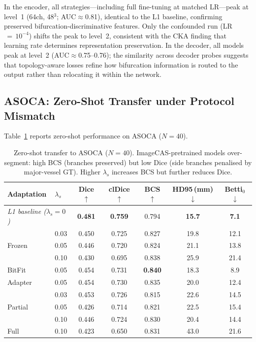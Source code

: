 \documentclass[runningheads]{llncs}
\begin{document}
In the encoder, all strategies---including full fine-tuning at matched LR---peak at level~1 (64ch, 48$^3$; AUC${\approx}$0.81), identical to the L1 baseline, confirming preserved bifurcation-discriminative features.
Only the confounded run (LR$\,{=}\,10^{-4}$) shifts the peak to level~2, consistent with the CKA finding that learning rate determines representation preservation.
In the decoder, all models peak at level~2 (AUC${\approx}$0.75--0.76); the similarity across decoder probes suggests that topology-aware losses refine how bifurcation information is routed to the output rather than relocating it within the network.

\subsection{ASOCA: Zero-Shot Transfer under Protocol Mismatch}
\label{sec:asoca_results}

Table~\ref{tab:zeroshot} reports zero-shot performance on ASOCA ($N{=}40$).

\begin{table}[t]
\caption{Zero-shot transfer to ASOCA ($N{=}40$). ImageCAS-pretrained models over-segment: high BCS (branches preserved) but low Dice (side branches penalised by major-vessel GT). Higher $\lambda_s$ increases BCS but further reduces Dice.}
\label{tab:zeroshot}
\centering
\small
\begin{tabular}{llccccc}
\toprule
Adaptation & $\lambda_s$ & Dice $\uparrow$ & clDice $\uparrow$ & BCS $\uparrow$ & HD95\,(mm) $\downarrow$ & Betti$_0$ $\downarrow$ \\
\midrule
\multicolumn{2}{l}{\textit{L1 baseline ($\lambda_s{=}0$)}} & \textbf{0.481} & \textbf{0.759} & 0.794 & \textbf{15.7} & \textbf{7.1} \\
\midrule
\multirow{3}{*}{Frozen}
 & 0.03 & 0.450 & 0.725 & 0.827 & 19.8 & 12.1 \\
 & 0.05 & 0.446 & 0.720 & 0.824 & 21.1 & 13.8 \\
 & 0.10 & 0.430 & 0.695 & 0.838 & 25.9 & 21.4 \\
\midrule
BitFit & 0.05 & 0.454 & 0.731 & \textbf{0.840} & 18.3 & 8.9 \\
Adapter & 0.05 & 0.454 & 0.730 & 0.835 & 20.0 & 12.4 \\
\midrule
\multirow{3}{*}{Partial}
 & 0.03 & 0.453 & 0.726 & 0.815 & 22.6 & 14.5 \\
 & 0.05 & 0.426 & 0.714 & 0.821 & 22.5 & 15.4 \\
 & 0.10 & 0.446 & 0.724 & 0.830 & 20.4 & 14.4 \\
\midrule
Full & 0.10 & 0.423 & 0.650 & 0.831 & 43.0 & 21.6 \\
\bottomrule
\end{tabular}
\end{table}
\end{document}
